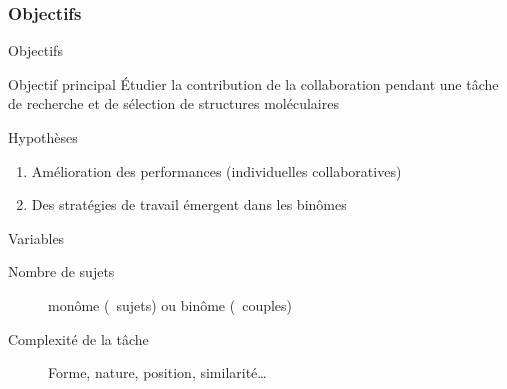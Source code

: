 \documentclass[english,french,dvips,10pt]{mybeamer}
\begin{document}
	\subsubsection{Objectifs}
	\begin{myframe}{Objectifs}
		\begin{myblock}{Objectif principal}
			Étudier la contribution de la collaboration pendant une tâche de recherche et de sélection de structures moléculaires
		\end{myblock}
		\begin{myplusblock}{Hypothèses}
			\begin{enumerate}
				\item Amélioration des performances (individuelles \myvs collaboratives)
				\item Des stratégies de travail émergent dans les binômes
			\end{enumerate}
		\end{myplusblock}
		\begin{myblock}{Variables}
			\begin{description}
				\item[Nombre de sujets] monôme (~sujets) ou binôme (~couples)
				\item[Complexité de la tâche] Forme, nature, position, similarité\dots{}
			\end{description}
		\end{myblock}
	\end{myframe}
\end{document}
